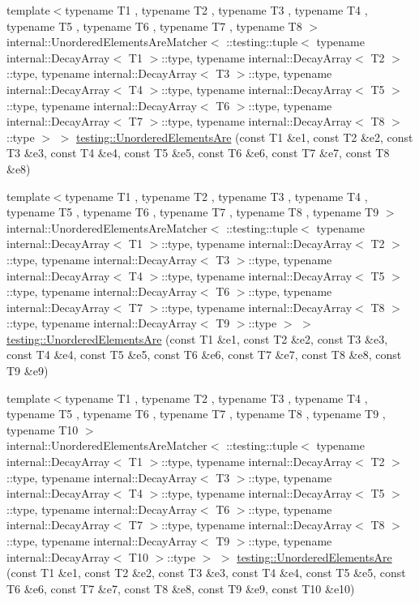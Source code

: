 \begin{DoxyCompactItemize}
\item 
{\footnotesize template$<$typename T1 , typename T2 , typename T3 , typename T4 , typename T5 , typename T6 , typename T7 , typename T8 $>$ }\\internal\+::\+Unordered\+Elements\+Are\+Matcher$<$ \+::testing\+::tuple$<$ typename internal\+::\+Decay\+Array$<$ T1 $>$\+::type, typename internal\+::\+Decay\+Array$<$ T2 $>$\+::type, typename internal\+::\+Decay\+Array$<$ T3 $>$\+::type, typename internal\+::\+Decay\+Array$<$ T4 $>$\+::type, typename internal\+::\+Decay\+Array$<$ T5 $>$\+::type, typename internal\+::\+Decay\+Array$<$ T6 $>$\+::type, typename internal\+::\+Decay\+Array$<$ T7 $>$\+::type, typename internal\+::\+Decay\+Array$<$ T8 $>$\+::type $>$ $>$ \hyperlink{namespacetesting_a0f30358234947d21c7f39f15a8395d04}{testing\+::\+Unordered\+Elements\+Are} (const T1 \&e1, const T2 \&e2, const T3 \&e3, const T4 \&e4, const T5 \&e5, const T6 \&e6, const T7 \&e7, const T8 \&e8)
\item 
{\footnotesize template$<$typename T1 , typename T2 , typename T3 , typename T4 , typename T5 , typename T6 , typename T7 , typename T8 , typename T9 $>$ }\\internal\+::\+Unordered\+Elements\+Are\+Matcher$<$ \+::testing\+::tuple$<$ typename internal\+::\+Decay\+Array$<$ T1 $>$\+::type, typename internal\+::\+Decay\+Array$<$ T2 $>$\+::type, typename internal\+::\+Decay\+Array$<$ T3 $>$\+::type, typename internal\+::\+Decay\+Array$<$ T4 $>$\+::type, typename internal\+::\+Decay\+Array$<$ T5 $>$\+::type, typename internal\+::\+Decay\+Array$<$ T6 $>$\+::type, typename internal\+::\+Decay\+Array$<$ T7 $>$\+::type, typename internal\+::\+Decay\+Array$<$ T8 $>$\+::type, typename internal\+::\+Decay\+Array$<$ T9 $>$\+::type $>$ $>$ \hyperlink{namespacetesting_a2e03e363e193ef512bf9fa964c484375}{testing\+::\+Unordered\+Elements\+Are} (const T1 \&e1, const T2 \&e2, const T3 \&e3, const T4 \&e4, const T5 \&e5, const T6 \&e6, const T7 \&e7, const T8 \&e8, const T9 \&e9)
\item 
{\footnotesize template$<$typename T1 , typename T2 , typename T3 , typename T4 , typename T5 , typename T6 , typename T7 , typename T8 , typename T9 , typename T10 $>$ }\\internal\+::\+Unordered\+Elements\+Are\+Matcher$<$ \+::testing\+::tuple$<$ typename internal\+::\+Decay\+Array$<$ T1 $>$\+::type, typename internal\+::\+Decay\+Array$<$ T2 $>$\+::type, typename internal\+::\+Decay\+Array$<$ T3 $>$\+::type, typename internal\+::\+Decay\+Array$<$ T4 $>$\+::type, typename internal\+::\+Decay\+Array$<$ T5 $>$\+::type, typename internal\+::\+Decay\+Array$<$ T6 $>$\+::type, typename internal\+::\+Decay\+Array$<$ T7 $>$\+::type, typename internal\+::\+Decay\+Array$<$ T8 $>$\+::type, typename internal\+::\+Decay\+Array$<$ T9 $>$\+::type, typename internal\+::\+Decay\+Array$<$ T10 $>$\+::type $>$ $>$ \hyperlink{namespacetesting_ae0e6c9754b17623a64358da8d38c4d13}{testing\+::\+Unordered\+Elements\+Are} (const T1 \&e1, const T2 \&e2, const T3 \&e3, const T4 \&e4, const T5 \&e5, const T6 \&e6, const T7 \&e7, const T8 \&e8, const T9 \&e9, const T10 \&e10)

\end{DoxyCompactItemize}
